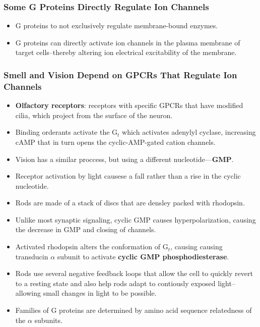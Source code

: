 \documentclass[12pt,a4paper]{article}
\begin{document}
\subsubsection{Some G Proteins Directly Regulate Ion Channels}
\begin{itemize}
    \item G proteins to not exclusively regulate membrane-bound enzymes. 
    \item G proteins can directly activate ion channels in the plasma membrane of target cells--thereby altering ion electrical excitability of the membrane.
\end{itemize}

\subsubsection{Smell and Vision Depend on GPCRs That Regulate Ion Channels}
\begin{itemize}
    \item \textbf{Olfactory receptors}: receptors with specific GPCRs that have modified cilia, which project from the surface of the neuron.
    \item Binding orderants activate the G\(_{t}\) which activates adenylyl cyclase, increasing cAMP that in turn opens the cyclic-AMP-gated cation channels.
    \item Vision has a similar proccess, but using a different nucleotide---\textbf{GMP}.
    \item Receptor activation by light causese a fall rather than a rise in the cyclic nucleotide.
    \item Rods are made of a stack of discs that are densley packed with rhodopsin.
    \item Unlike most synaptic signaling, cyclic GMP causes hyperpolarization, causing the decrease in GMP and closing of channels.
    \item Activated rhodopsin alters the conformation of G$_t$, causing causing transducin $\alpha$ subunit to activate \textbf{cyclic GMP phosphodiesterase}.
    \item Rods use several negative feedback loops that allow the cell to quickly revert to a resting state and also help rods adapt to contiously exposed light--allowing small changes in light to be possible.
    \item Families of G proteins are determined by amino acid sequence relatedness of the $\alpha$ subunits.
\end{itemize}
\end{document}
